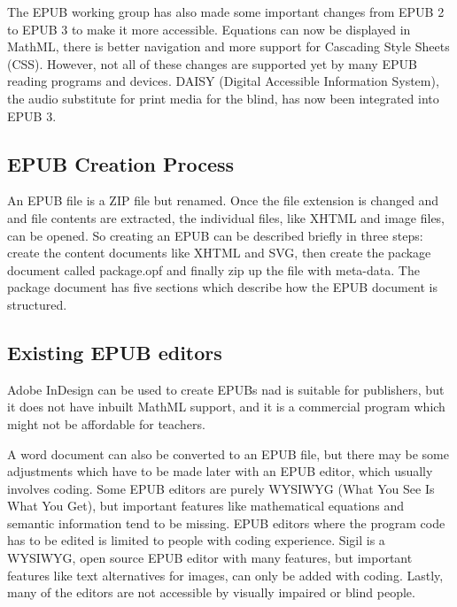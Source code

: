 \documentclass{llncs}
\begin{document}
The EPUB working group has also made some important changes from EPUB 2 to EPUB 3  to make it more accessible. Equations can now be displayed in MathML, there is better navigation and more support for Cascading Style Sheets (CSS). However, not all of these changes are supported yet by many EPUB reading programs and devices.\cite{EPUB30changes} DAISY (Digital Accessible Information System), the audio substitute for print media for the blind, has now been integrated into EPUB 3.\cite{daisyAccessibility}

\subsection{EPUB Creation Process}
An EPUB file is a ZIP file but renamed.\cite{WhatIsEpub3} Once the file extension is changed and and file contents are extracted, the individual files, like XHTML and image files, can be opened. So creating an EPUB can be described briefly in three steps: create the content documents like XHTML and SVG, then create the package document  called package.opf and finally zip up the file with meta-data.
The package document has five sections which describe how the EPUB document is structured.\cite{EPUB3bp}

\subsection{Existing EPUB editors}
Adobe InDesign can be used to create EPUBs nad is suitable for publishers, but it does not have inbuilt MathML support, and it is a commercial program which might not be affordable for teachers.


A word document can also be converted to an EPUB file, but there may be some adjustments which have to be made later with an EPUB editor, which usually involves coding. 
Some EPUB editors are purely WYSIWYG (What You See Is What You Get), but important features like mathematical equations and semantic information tend to be missing. EPUB editors where the program code has to be edited is limited to people with coding experience. Sigil is a WYSIWYG, open source EPUB editor with many features, but important features like text alternatives for images, can only be added with coding.
Lastly, many of the editors are not accessible by visually impaired or blind people. 
\end{document}

